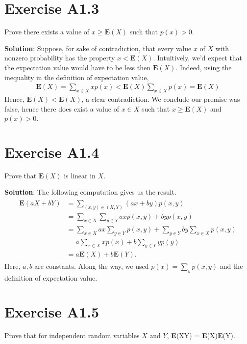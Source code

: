 \documentclass{book}
\begin{document}
\section*{Exercise A1.3}
    Prove there exists a value of $x\geq\textbf{E}(X)$ such that $p(x)>0$.
    
    \textbf{Solution}: Suppose, for sake of contradiction, that every value $x$ of $X$ with nonzero probability has the property $x < \textbf{E}(X)$. Intuitively, we'd expect that the expectation value would have to be less then $\textbf{E}(X)$. Indeed, using the inequality in the definition of expectation value,
    \begin{align}
        \textbf{E}(X) = \sum_{x\in X} x p(x) < \textbf{E}(X)\sum_{x\in X}p(x) = \textbf{E}(X)
    \end{align}
    Hence, $\textbf{E}(X)<\textbf{E}(X)$, a clear contradiction. We conclude our premise was false, hence there does exist a value of $x\in X$ such that $x \geq \textbf{E}(X)$ and $p(x)>0$.

\section*{Exercise A1.4} 
    Prove that $\textbf{E}(X)$ is linear in $X$.
    
    \textbf{Solution}: The following computation gives us the result.
    \begin{align}
    \begin{aligned}
        \textbf{E}(aX+bY) &= \sum_{(x,y)\in(X,Y)}(ax+by)p(x,y) \\
        &= \sum_{x\in X}\sum_{y\in Y}axp(x,y) + byp(x,y) \\
        &=\sum_{x\in X}ax\sum_{y\in Y}p(x,y) + \sum_{y\in Y}by\sum_{x\in X}p(x,y) \\
        &=a\sum_{x\in X}x p(x) + b\sum_{y\in Y}yp(y) \\
        &=a\textbf{E}(X) + b\textbf{E}(Y).
    \end{aligned}
    \end{align}
    Here, $a,b$ are constants. Along the way, we used $p(x) = \sum_y p(x,y)$ and the definition of expectation value.

\section*{Exercise A1.5}
    Prove that for independent random variables $X$ and $Y$, \textbf{E}(XY) = \textbf{E}(X)\textbf{E}(Y).
    
\end{document}

